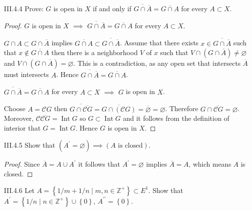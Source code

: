 \begin{problem}{III.4.4}
Prove: \(G\) is open in \(X\) if and only if \( \overline{G \cap \overline{A}} = \overline{G \cap A} \) for every \( A \subset X \).
\end{problem}

\begin{proof}
    \( G \) is open in \(X\) \( \implies \) \( \overline{G \cap \overline{A}} = \overline{G \cap A} \) for every \( A \subset X \).

    \( G \cap A \subset G \cap \overline{A} \) implies \( \overline{G \cap A} \subset \overline{G \cap \overline{A}} \). Assume that there exists \( x \in \overline{G \cap \overline{A}} \) such that \( x \notin \overline{G \cap A} \) then there is a neighborhood \(V\) of \(x\) such that \( V \cap (G \cap \overline{A}) \ne \varnothing \) and \( V \cap (G \cap \overline{A}) = \varnothing \). This is a contradiction, as any open set that intersects \( \overline{A} \) must intersects \( A \). Hence \( \overline{G \cap \overline{A}} = \overline{G \cap A} \).

    \( \overline{G \cap \overline{A}} = \overline{G \cap A} \) for every \( A \subset X \) \( \implies \)  \( G \) is open in \(X\).

    Choose \( A = \mathscr{C}G \) then \( \overline{G \cap \overline{\mathscr{C}G}} = \overline{G \cap (\mathscr{C}G)} = \overline{\varnothing} = \varnothing \). Therefore \( G \cap \overline{\mathscr{C}G} = \varnothing \). Moreover, \( \mathscr{C}\overline{\mathscr{C}G} = \operatorname{Int} G \) so \( G \subset \operatorname{Int} G \) and it follows from the definition of interior that \( G = \operatorname{Int} G \). Hence \( G \) is open in \( X \).
\end{proof}

\begin{problem}{III.4.5}
Show that \( (A^{\prime} = \varnothing) \implies (A \text{ is closed}) \).
\end{problem}

\begin{proof}
    Since \( \overline{A} = A \cup A^{\prime} \) it follows that \( A^{\prime} = \varnothing \) implies \( \overline{A} = A \), which means \( A \) is closed.
\end{proof}

\begin{problem}{III.4.6}
Let \(A = \left\{ 1/m + 1/n \mid m, n \in \mathbb{Z}^{+} \right\} \subset E^{1} \). Show that \( A^{\prime} = \left\{ 1/n \mid n \in \mathbb{Z}^{+} \right\} \cup \left\{ 0 \right\} \), \( A^{\prime\prime} = \left\{0\right\} \).
\end{problem}

